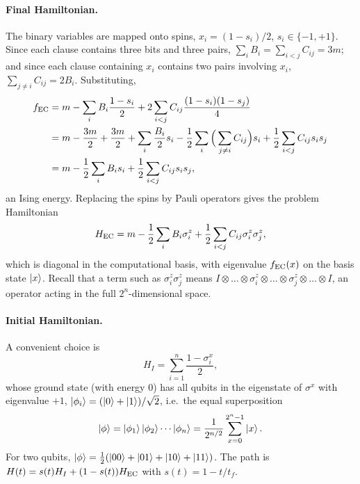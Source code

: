 \paragraph{Final Hamiltonian.} The binary variables are mapped onto spins, $x_i=(1-s_i)/2$, $s_i\in\{-1,+1\}$. Since each clause contains three bits and three pairs, $\sum_iB_i=\sum_{i<j}C_{ij}=3m$; and since each clause containing
$x_i$ contains two pairs involving $x_i$, $\sum_{j\neq i}C_{ij}=2B_i$. Substituting,
\begin{align}
  f_{\rm EC}&=m-\sum_iB_i\frac{1-s_i}2+2\sum_{i<j}C_{ij}\frac{(1-s_i)(1-s_j)}4\nonumber\\
  &=m-\frac{3m}2+\frac{3m}2+\sum_i\frac{B_i}2s_i-\frac12\sum_i\Big(\sum_{j\neq i}C_{ij}\Big)s_i+\frac12\sum_{i<j}C_{ij}s_is_j\nonumber\\
  &=m-\frac12\sum_iB_is_i+\frac12\sum_{i<j}C_{ij}s_is_j,
\end{align}
an Ising energy. Replacing the spins by Pauli operators gives the problem Hamiltonian
\begin{equation}
  H_{\rm EC}=m-\frac12\sum_iB_i\sigma_i^z+\frac12\sum_{i<j}C_{ij}\sigma_i^z\sigma_j^z,
\end{equation}
which is diagonal in the computational basis, with eigenvalue $f_{\rm EC}(x)$ on the basis state $\left|x\right\rangle$. Recall that a term such as $\sigma_i^z\sigma_j^z$ means $I\otimes\dots\otimes\sigma_i^z\otimes\dots\otimes\sigma_j^z\otimes\dots\otimes I$,
an operator acting in the full $2^n$-dimensional space.

\paragraph{Initial Hamiltonian.} A convenient choice is
\begin{equation}
  H_I=\sum_{i=1}^n\frac{1-\sigma_i^x}2,
\end{equation}
whose ground state (with energy 0) has all qubits in the eigenstate of $\sigma^x$ with eigenvalue $+1$, $\left|\phi_i\right\rangle=(\left|0\right\rangle+\left|1\right\rangle)/\sqrt2$, i.e.\ the equal superposition
\begin{equation}
  \left|\phi\right\rangle=\left|\phi_1\right\rangle\left|\phi_2\right\rangle\cdots\left|\phi_n\right\rangle=\frac1{2^{n/2}}\sum_{x=0}^{2^n-1}\left|x\right\rangle.
\end{equation}
For two qubits, $\left|\phi\right\rangle=\frac12(\left|00\right\rangle+\left|01\right\rangle+\left|10\right\rangle+\left|11\right\rangle)$. The path is $H(t)=s(t)H_I+(1-s(t))H_{\rm EC}$ with $s(t)=1-t/t_f$.

